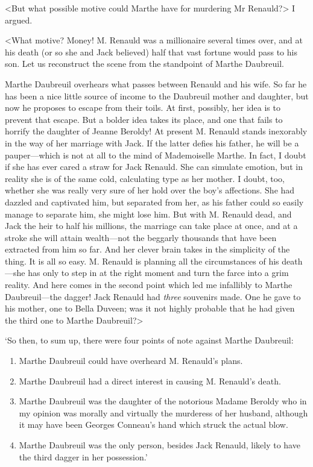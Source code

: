  <But what possible motive could Marthe have for murdering Mr Renauld?> I argued. 

 <What motive? Money! M. Renauld was a millionaire several times over, and at his death (or so she and Jack believed) half that vast fortune would pass to his son. Let us reconstruct the scene from the standpoint of Marthe Daubreuil. 

 Marthe Daubreuil overhears what passes between Renauld and his wife. So far he has been a nice little source of income to the Daubreuil mother and daughter, but now he proposes to escape from their toils. At first, possibly, her idea is to prevent that escape. But a bolder idea takes its place, and one that fails to horrify the daughter of Jeanne Beroldy! At present M. Renauld stands inexorably in the way of her marriage with Jack. If the latter defies his father, he will be a pauper—which is not at all to the mind of Mademoiselle Marthe. In fact, I doubt if she has ever cared a straw for Jack Renauld. She can simulate emotion, but in reality she is of the same cold, calculating type as her mother. I doubt, too, whether she was really very sure of her hold over the boy's affections. She had dazzled and captivated him, but separated from her, as his father could so easily manage to separate him, she might lose him. But with M. Renauld dead, and Jack the heir to half his millions, the marriage can take place at once, and at a stroke she will attain wealth—not the beggarly thousands that have been extracted from him so far. And her clever brain takes in the simplicity of the thing. It is all so easy. M. Renauld is planning all the circumstances of his death—she has only to step in at the right moment and turn the farce into a grim reality. And here comes in the second point which led me infallibly to Marthe Daubreuil—the dagger! Jack Renauld had \emph{three} souvenirs made. One he gave to his mother, one to Bella Duveen; was it not highly probable that he had given the third one to Marthe Daubreuil?>

`So then, to sum up, there were four points of note against Marthe Daubreuil: 

\begin{enumerate}
\item Marthe Daubreuil could have overheard M. Renauld's plans. 

\item Marthe Daubreuil had a direct interest in causing M. Renauld's death. 

\item Marthe Daubreuil was the daughter of the notorious Madame Beroldy who in my opinion was morally and virtually the murderess of her husband, although it may have been Georges Conneau's hand which struck the actual blow. 

\item Marthe Daubreuil was the only person, besides Jack Renauld, likely to have the third dagger in her possession.'
\end{enumerate} 

